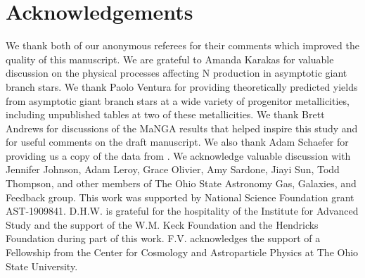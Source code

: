 \documentclass[ms.tex]{subfiles}
\begin{document}
\section{Acknowledgements}
\label{sec:acknowledgements}

{\color{red}
We thank both of our anonymous referees for their comments which improved the
quality of this manuscript.
}
We are grateful to Amanda Karakas for valuable discussion on the physical
processes affecting N production in asymptotic giant branch stars.
We thank Paolo Ventura for providing theoretically predicted yields from
asymptotic giant branch stars at a wide variety of progenitor metallicities,
including unpublished tables at two of these metallicities.
We thank Brett Andrews for discussions of the MaNGA results that helped inspire
this study and for useful comments on the draft manuscript.
We also thank Adam Schaefer for providing us a copy of the data from
\citet{Schaefer2020}.
We acknowledge valuable discussion with Jennifer Johnson, Adam Leroy, Grace
Olivier, Amy Sardone, Jiayi Sun, Todd Thompson, and other members of The Ohio
State Astronomy Gas, Galaxies, and Feedback group.
This work was supported by National Science Foundation grant AST-1909841.
D.H.W. is grateful for the hospitality of the Institute for Advanced Study and
the support of the W.M. Keck Foundation and the Hendricks Foundation during
part of this work.
F.V. acknowledges the support of a Fellowship from the Center for Cosmology and
Astroparticle Physics at The Ohio State University.
\end{document}
